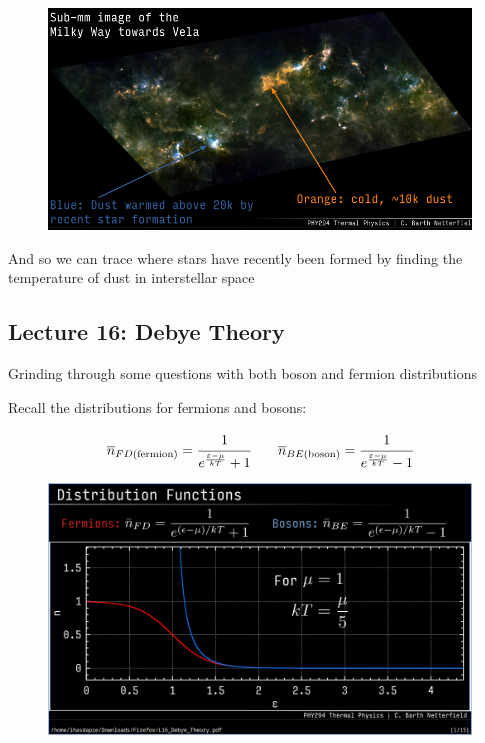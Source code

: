 \documentclass[10pt]{article}
\begin{document}
\begin{figure}[H]
	\centering
	\includegraphics[width=0.8\linewidth]{img/image_2022-04-10-02-10-46.png}
\end{figure}

And so we can trace where stars have recently been formed by finding the temperature of dust in interstellar space







\subsection{Lecture 16: Debye Theory}
\begin{blockquote}
	Grinding through some questions with both boson and fermion distributions
\end{blockquote}

Recall the distributions for fermions and bosons:

\begin{equation}
	\overline{n}_{FD \text{(fermion)}} = \cfrac{1}{e^{\frac{\varepsilon - \mu}{kT}} + 1} \qquad
	\overline{n}_{BE \text{(boson)}} = \cfrac{1}{e^{\frac{\varepsilon - \mu}{kT}} - 1}
\end{equation}

\begin{figure}[H]
	\centering
	\includegraphics[width=0.8\linewidth]{img/294_ferm_bos_dist.png}
\end{figure}
\end{document}
